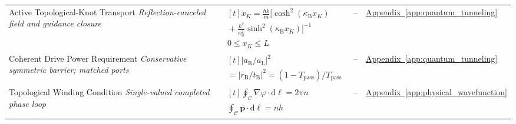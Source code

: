 \begin{longtable}{@{} p{4.5cm} p{6cm} c p{4cm} @{}}
{\raggedright Active Topological-Knot Transport \newline \textit{Reflection-canceled field and guidance closure}\par} & {\raggedright $\begin{gathered}[t]\dot x_K=\frac{\hbar k}{m}\bigl[\cosh^2(\kappa_{\mathrm B}x_K) \\ {}+\frac{k^2}{\kappa_{\mathrm B}^2}\sinh^2(\kappa_{\mathrm B}x_K)\bigr]^{-1} \\ 0\leq x_K\leq L\end{gathered}$\par} & -- & {\raggedright \hyperref[app:quantum_tunneling]{Appendix~\ref*{app:quantum_tunneling}}\par} \\

{\raggedright Coherent Drive Power Requirement \newline \textit{Conservative symmetric barrier; matched ports}\par} & {\raggedright $\begin{gathered}[t]\left|a_{\mathrm R}/a_{\mathrm L}\right|^2 \\ =|r_{\mathrm B}/t_{\mathrm B}|^2=(1-T_{\mathrm{pass}})/T_{\mathrm{pass}}\end{gathered}$\par} & -- & {\raggedright \hyperref[app:quantum_tunneling]{Appendix~\ref*{app:quantum_tunneling}}\par} \\

{\raggedright Topological Winding Condition \newline \textit{Single-valued completed phase loop}\par} & {\raggedright $\begin{gathered}[t]\oint_{\mathcal C}\nabla\varphi\!\cdot\mathrm d\boldsymbol\ell=2\pi n \\ \oint_{\mathcal C}\mathbf p\!\cdot\mathrm d\boldsymbol\ell=nh\end{gathered}$\par} & -- & {\raggedright \hyperref[app:physical_wavefunction]{Appendix~\ref*{app:physical_wavefunction}}\par} \\

\bottomrule
\end{longtable}

